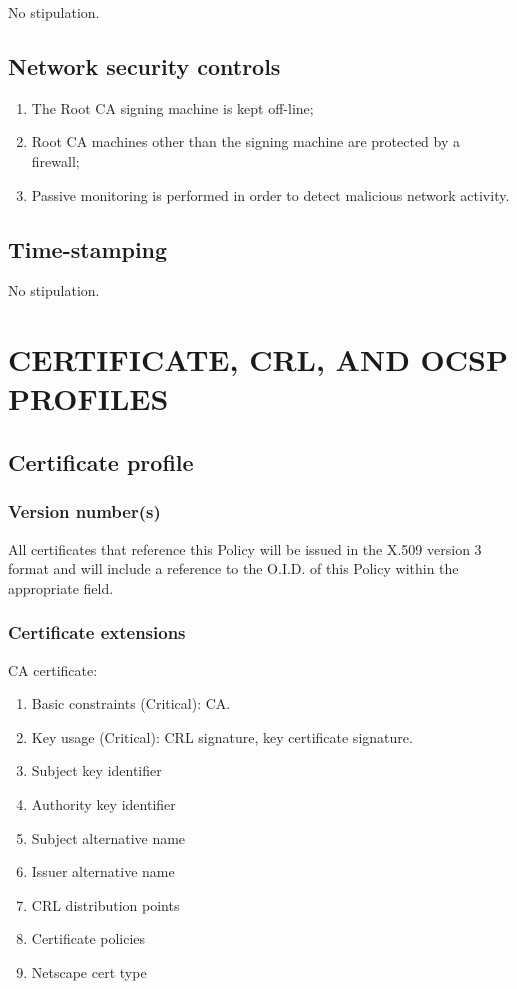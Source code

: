\documentclass[11pt,a4paper,titlepage]{book}
\begin{document}
No stipulation.

\section{Network security controls}

\begin{enumerate}
\item{The Root CA signing machine is kept off-line;}
\item{Root CA machines other than the signing machine are protected by a firewall;}
\item{Passive monitoring is performed in order to detect malicious network activity.}
\end{enumerate}

\section{Time-stamping}

No stipulation.

\chapter{CERTIFICATE, CRL, AND OCSP PROFILES}
\section{Certificate profile}
\subsection{Version number(s)}

All certificates that reference this Policy will be issued in the X.509 version 3 format and will include a reference to the O.I.D. of this Policy within the appropriate field.

\subsection{Certificate extensions}

CA certificate:
\begin{enumerate}
\item{Basic constraints (Critical): CA.}
\item{Key usage (Critical): CRL signature, key certificate signature.}
\item{Subject key identifier}
\item{Authority key identifier}
\item{Subject alternative name}
\item{Issuer alternative name}
\item{CRL distribution points}
\item{Certificate policies}
\item{Netscape cert type}
\end{enumerate}
\end{document}

